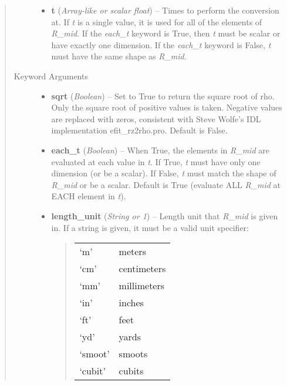 \documentclass[letterpaper,10pt,english]{sphinxmanual}
\begin{document}
\begin{fulllineitems}
\begin{fulllineitems}
\begin{quote}
\begin{description}
\begin{itemize}
\item {} 
\textbf{t} (\emph{Array-like or scalar float}) --
Times to perform the conversion at.
If \emph{t} is a single value, it is used for all of the elements of
\emph{R\_mid}. If the \emph{each\_t} keyword is True, then \emph{t} must be scalar
or have exactly one dimension. If the \emph{each\_t} keyword is False,
\emph{t} must have the same shape as \emph{R\_mid}.

\end{itemize}

\item[{Keyword Arguments}] \leavevmode\begin{itemize}
\item {} 
\textbf{sqrt} (\emph{Boolean}) --
Set to True to return the square root of rho.
Only the square root of positive values is taken. Negative
values are replaced with zeros, consistent with Steve Wolfe's
IDL implementation efit\_rz2rho.pro. Default is False.

\item {} 
\textbf{each\_t} (\emph{Boolean}) --
When True, the elements in \emph{R\_mid} are evaluated
at each value in \emph{t}. If True, \emph{t} must have only one dimension
(or be a scalar). If False, \emph{t} must match the shape of \emph{R\_mid}
or be a scalar. Default is True (evaluate ALL \emph{R\_mid} at EACH
element in \emph{t}).

\item {} 
\textbf{length\_unit} (\emph{String or 1}) --
Length unit that \emph{R\_mid} is given in.
If a string is given, it must be a valid unit specifier:
\begin{quote}

\begin{tabulary}{\linewidth}{|L|L|}
\hline

`m'
 & 
meters
\\

`cm'
 & 
centimeters
\\

`mm'
 & 
millimeters
\\

`in'
 & 
inches
\\

`ft'
 & 
feet
\\

`yd'
 & 
yards
\\

`smoot'
 & 
smoots
\\

`cubit'
 & 
cubits
\\


\end{tabulary}
\end{quote}
\end{itemize}
\end{description}
\end{quote}
\end{fulllineitems}
\end{fulllineitems}
\end{document}
